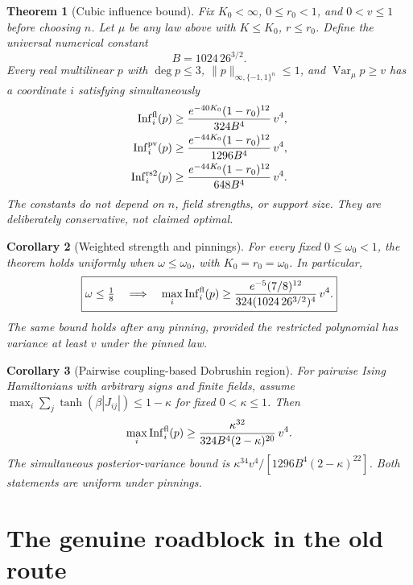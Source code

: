 \documentclass[11pt]{article}
\newtheorem{theorem}{Theorem}[section]
\newtheorem{corollary}[theorem]{Corollary}
\newcommand{\Var}{\operatorname{Var}}
\newcommand{\Inf}{\operatorname{Inf}}
\begin{document}
\begin{theorem}[Cubic influence bound]\label{thm:cubic}
Fix $K_0<\infty$, $0\le r_0<1$, and $0<v\le1$ before choosing
$n$. Let $\mu$ be any law above with $K\le K_0$, $r\le r_0$.
Define the universal numerical constant
\[
 B=1024\,26^{3/2}.
\]
Every real multilinear $p$ with $\deg p\le3$,
$\|p\|_{\infty,\{-1,1\}^n}\le1$, and $\Var_\mu p\ge v$ has
a coordinate $i$ satisfying simultaneously
\begin{align}
 \Inf_i^{\rm fl}(p)&\ge
 \frac{e^{-40K_0}(1-r_0)^{12}}{324B^4}\,v^4,
 \label{eq:mainfl}\\
 \Inf_i^{\rm pv}(p)&\ge
 \frac{e^{-44K_0}(1-r_0)^{12}}{1296B^4}\,v^4,
 \label{eq:mainpv}\\
 \Inf_i^{\rm rs2}(p)&\ge
 \frac{e^{-44K_0}(1-r_0)^{12}}{648B^4}\,v^4.
 \label{eq:mainrs}
\end{align}
The constants do not depend on $n$, field strengths, or support size.
They are deliberately conservative, not claimed optimal.
\end{theorem}

\begin{corollary}[Weighted strength and pinnings]\label{cor:omega}
For every fixed $0\le\omega_0<1$, the theorem holds uniformly when
$\omega\le\omega_0$, with $K_0=r_0=\omega_0$. In particular,
\[
 \boxed{\omega\le\tfrac18\quad\Longrightarrow\quad
 \max_i\Inf_i^{\rm fl}(p)\ge
 \frac{e^{-5}(7/8)^{12}}{324(1024\,26^{3/2})^4}\,v^4.}
\]
The same bound holds after any pinning, provided the restricted
polynomial has variance at least $v$ under the pinned law.
\end{corollary}

\begin{corollary}[Pairwise coupling-based Dobrushin region]\label{cor:pairwise}
For pairwise Ising Hamiltonians with arbitrary signs and finite fields,
assume $\max_i\sum_j\tanh(\beta|J_{ij}|)\le1-\kappa$ for fixed
$0<\kappa\le1$. Then
\[
 \max_i\Inf_i^{\rm fl}(p)\ge
 \frac{\kappa^{32}}{324B^4(2-\kappa)^{20}}\,v^4.
\]
The simultaneous posterior-variance bound is
$\kappa^{34}v^4/[1296B^4(2-\kappa)^{22}]$.
Both statements are uniform under pinnings.
\end{corollary}

\section{The genuine roadblock in the old route}
\end{document}
